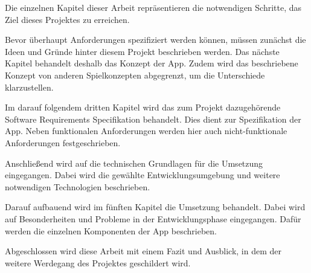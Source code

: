 Die einzelnen Kapitel dieser Arbeit repräsentieren die notwendigen Schritte, das Ziel dieses Projektes zu erreichen.

Bevor überhaupt Anforderungen spezifiziert werden können, müssen zunächst die Ideen und Gründe hinter diesem Projekt beschrieben werden. Das nächste Kapitel behandelt deshalb das Konzept der App. Zudem wird das beschriebene Konzept von anderen Spielkonzepten abgegrenzt, um die Unterschiede klarzustellen.

Im darauf folgendem dritten Kapitel wird das zum Projekt dazugehörende Software Requirements Specifikation behandelt. Dies dient zur Spezifikation der App. Neben funktionalen Anforderungen werden hier auch nicht-funktionale Anforderungen festgeschrieben.

Anschließend wird auf die technischen Grundlagen für die Umsetzung eingegangen. Dabei wird die gewählte Entwicklungsumgebung und weitere notwendigen Technologien beschrieben.

Darauf aufbauend wird im fünften Kapitel die Umsetzung behandelt. Dabei wird auf Besonderheiten und Probleme in der Entwicklungsphase eingegangen. Dafür werden die einzelnen Komponenten der App beschrieben.

Abgeschlossen wird diese Arbeit mit einem Fazit und Ausblick, in dem der weitere Werdegang des Projektes geschildert wird.